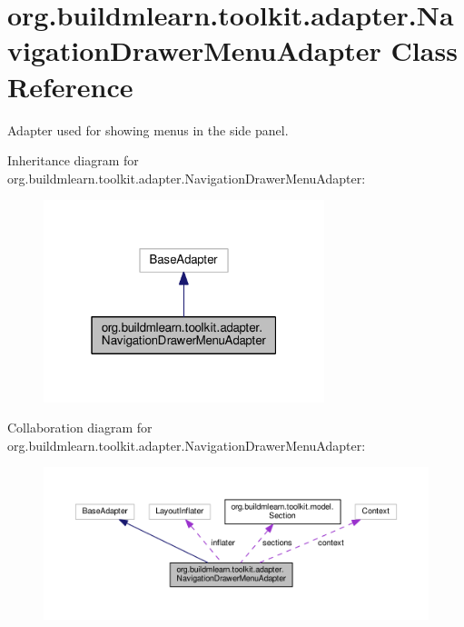 \hypertarget{classorg_1_1buildmlearn_1_1toolkit_1_1adapter_1_1NavigationDrawerMenuAdapter}{}\section{org.\+buildmlearn.\+toolkit.\+adapter.\+Navigation\+Drawer\+Menu\+Adapter Class Reference}
\label{classorg_1_1buildmlearn_1_1toolkit_1_1adapter_1_1NavigationDrawerMenuAdapter}


Adapter used for showing menus in the side panel.  




Inheritance diagram for org.\+buildmlearn.\+toolkit.\+adapter.\+Navigation\+Drawer\+Menu\+Adapter\+:
\nopagebreak
\begin{figure}[H]
\begin{center}
\leavevmode
\includegraphics[width=232pt]{classorg_1_1buildmlearn_1_1toolkit_1_1adapter_1_1NavigationDrawerMenuAdapter__inherit__graph}
\end{center}
\end{figure}


Collaboration diagram for org.\+buildmlearn.\+toolkit.\+adapter.\+Navigation\+Drawer\+Menu\+Adapter\+:
\nopagebreak
\begin{figure}[H]
\begin{center}
\leavevmode
\includegraphics[width=350pt]{classorg_1_1buildmlearn_1_1toolkit_1_1adapter_1_1NavigationDrawerMenuAdapter__coll__graph}
\end{center}
\end{figure}
